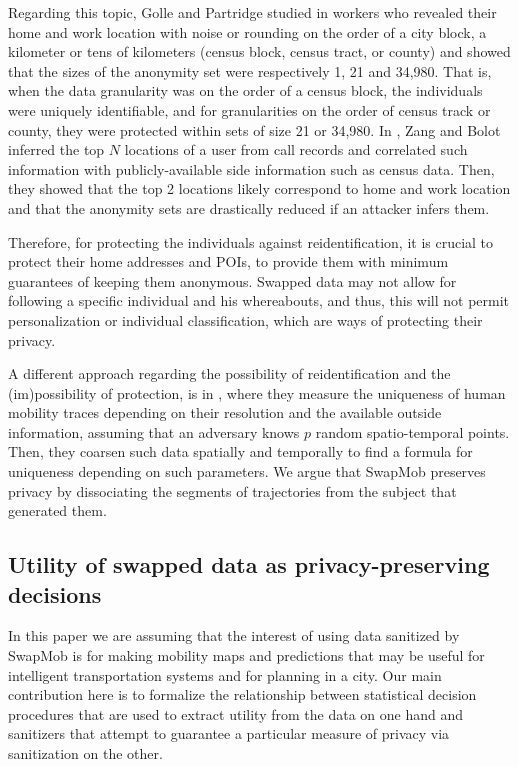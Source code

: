 \documentclass[review]{elsarticle}
\begin{document}
Regarding this topic, Golle and Partridge studied in \cite{Golle:2009} workers who revealed their home and work location with noise or rounding on the order of a city block, a kilometer or tens of kilometers (census block, census tract, or county) and showed that the sizes of the anonymity set were respectively 1, 21 and 34,980. That is, when the data granularity was on the order of a census block, the individuals were uniquely identifiable, and for granularities on the order of census track or county, they were protected within sets of size 21 or 34,980.
In \cite{Zang:2011},  Zang and Bolot inferred the top $N$ locations of a user from call records and correlated such information with publicly-available side  information such as census data.  Then, they showed that the top 2 locations likely correspond to home and work location and that the anonymity sets are drastically reduced if an attacker infers them.

Therefore, for protecting the individuals against reidentification, it is crucial to protect their home addresses and POIs, to provide them with minimum guarantees of keeping them anonymous.
Swapped data may not allow for following a specific individual and his whereabouts, and thus, this will not permit personalization or individual classification, which are ways of protecting their privacy.

A different approach regarding the possibility of reidentification and the (im)possibility of protection, is in \cite{demontjoye2013}, where they measure the uniqueness of human mobility traces depending on their resolution and the available outside information, assuming that an adversary knows $p$ random spatio-temporal points. Then, they coarsen such data spatially and temporally to find a formula for uniqueness depending on such parameters.  
We argue that SwapMob preserves privacy by dissociating the segments of trajectories from the subject that generated them.


\subsection{Utility of swapped data as privacy-preserving decisions}\label{sect:util}

In this paper we are assuming that the interest of using data sanitized by SwapMob is for making mobility maps and predictions that may be useful for intelligent transportation systems and for planning in a city.
Our main contribution here is to formalize the relationship between statistical decision procedures that are used to extract utility from the data on one hand and sanitizers that attempt to guarantee a particular measure of privacy via sanitization on the other.  
\end{document}
